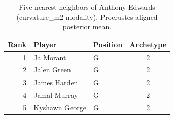 \begin{table}[htbp]
  \centering\small
  \begin{tabular}{rllc}
    \toprule
    Rank & Player & Position & Archetype \\
    \midrule
    1 & Ja Morant & G & 2 \\
    2 & Jalen Green & G & 2 \\
    3 & James Harden & G & 2 \\
    4 & Jamal Murray & G & 2 \\
    5 & Kyshawn George & G & 2 \\
    \bottomrule
  \end{tabular}
  \caption{Five nearest neighbors of Anthony Edwards (curvature_m2 modality), Procrustes-aligned posterior mean.}
  \label{tab:Anthony_Edwards_neighbors_curvature_m2}
\end{table}


